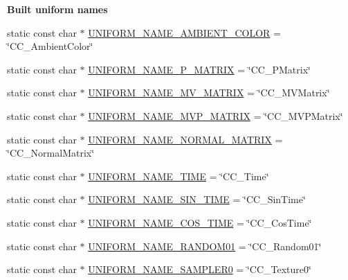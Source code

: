 \begin{Indent}\textbf{ Built uniform names}\par
\begin{DoxyCompactItemize}
\item 
static const char $\ast$ \hyperlink{classGLProgram_a468be218461aa184d8e7677a53690a4a}{U\+N\+I\+F\+O\+R\+M\+\_\+\+N\+A\+M\+E\+\_\+\+A\+M\+B\+I\+E\+N\+T\+\_\+\+C\+O\+L\+OR} = \char`\"{}C\+C\+\_\+\+Ambient\+Color\char`\"{}
\item 
static const char $\ast$ \hyperlink{classGLProgram_af4e8525260907fd74c66de4a945293f1}{U\+N\+I\+F\+O\+R\+M\+\_\+\+N\+A\+M\+E\+\_\+\+P\+\_\+\+M\+A\+T\+R\+IX} = \char`\"{}C\+C\+\_\+\+P\+Matrix\char`\"{}
\item 
static const char $\ast$ \hyperlink{classGLProgram_a81ec7f8c53c1499666267442984f036a}{U\+N\+I\+F\+O\+R\+M\+\_\+\+N\+A\+M\+E\+\_\+\+M\+V\+\_\+\+M\+A\+T\+R\+IX} = \char`\"{}C\+C\+\_\+\+M\+V\+Matrix\char`\"{}
\item 
static const char $\ast$ \hyperlink{classGLProgram_ab136f08f5607963c365a83d2f06ea3e0}{U\+N\+I\+F\+O\+R\+M\+\_\+\+N\+A\+M\+E\+\_\+\+M\+V\+P\+\_\+\+M\+A\+T\+R\+IX} = \char`\"{}C\+C\+\_\+\+M\+V\+P\+Matrix\char`\"{}
\item 
static const char $\ast$ \hyperlink{classGLProgram_afcfefc5e71e47dc144e3422af24dd7c2}{U\+N\+I\+F\+O\+R\+M\+\_\+\+N\+A\+M\+E\+\_\+\+N\+O\+R\+M\+A\+L\+\_\+\+M\+A\+T\+R\+IX} = \char`\"{}C\+C\+\_\+\+Normal\+Matrix\char`\"{}
\item 
static const char $\ast$ \hyperlink{classGLProgram_a972c8e877e19787df7c5d103e3241080}{U\+N\+I\+F\+O\+R\+M\+\_\+\+N\+A\+M\+E\+\_\+\+T\+I\+ME} = \char`\"{}C\+C\+\_\+\+Time\char`\"{}
\item 
static const char $\ast$ \hyperlink{classGLProgram_a4f4087ac974740bda4086e382badf228}{U\+N\+I\+F\+O\+R\+M\+\_\+\+N\+A\+M\+E\+\_\+\+S\+I\+N\+\_\+\+T\+I\+ME} = \char`\"{}C\+C\+\_\+\+Sin\+Time\char`\"{}
\item 
static const char $\ast$ \hyperlink{classGLProgram_ac6bf6464598c54dc89cf0b738e35a70e}{U\+N\+I\+F\+O\+R\+M\+\_\+\+N\+A\+M\+E\+\_\+\+C\+O\+S\+\_\+\+T\+I\+ME} = \char`\"{}C\+C\+\_\+\+Cos\+Time\char`\"{}
\item 
static const char $\ast$ \hyperlink{classGLProgram_a408f97b972a4a97f95f0f48ee51de60f}{U\+N\+I\+F\+O\+R\+M\+\_\+\+N\+A\+M\+E\+\_\+\+R\+A\+N\+D\+O\+M01} = \char`\"{}C\+C\+\_\+\+Random01\char`\"{}
\item 
static const char $\ast$ \hyperlink{classGLProgram_aafcf4ac6e28609d499d5d2cb875c659f}{U\+N\+I\+F\+O\+R\+M\+\_\+\+N\+A\+M\+E\+\_\+\+S\+A\+M\+P\+L\+E\+R0} = \char`\"{}C\+C\+\_\+\+Texture0\char`\"{}

\end{DoxyCompactItemize}
\end{Indent}
